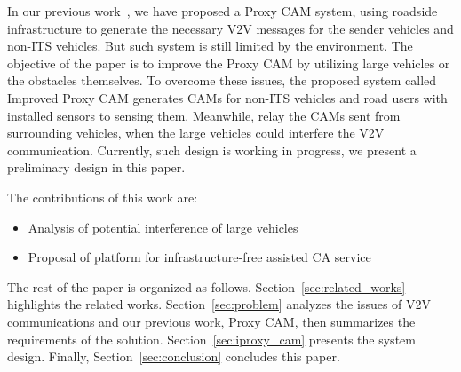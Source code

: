 In our previous work~\cite{kitazato2016proxy}, we have proposed a Proxy CAM system,
using roadside infrastructure to generate the necessary V2V messages for the sender vehicles and non-ITS vehicles.
But such system is still limited by the environment.
The objective of the paper is to improve the Proxy CAM by utilizing large vehicles or the obstacles themselves.
To overcome these issues,
the proposed system called Improved Proxy CAM generates CAMs for non-ITS vehicles and road users with installed sensors to sensing them.
Meanwhile, relay the CAMs sent from surrounding vehicles, when the large vehicles could interfere the V2V communication.
Currently, such design is working in progress, we present a preliminary design in this paper.

The contributions of this work are:
\begin{itemize}
\item Analysis of potential interference of large vehicles
\item Proposal of platform for infrastructure-free assisted CA service
\end{itemize}

The rest of the paper is organized as follows.
Section~\ref{sec:related_works} highlights the related works.
Section~\ref{sec:problem} analyzes the issues of V2V communications and our previous work, Proxy CAM,
then summarizes the requirements of the solution.
Section~\ref{sec:iproxy_cam} presents the system design.
Finally, Section~\ref{sec:conclusion} concludes this paper.